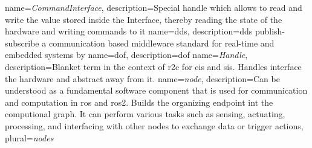 \hyphenation{
}

\newcommand{\mybibliographyfiles}{Bibliography/ipr_articles,Bibliography/kit_template_example_bibliography,Bibliography/masterthesis}


{
    name={\textit{CommandInterface}},
    description={Special \gls{handle} which allows to read and write the value stored inside the Interface, thereby reading the state of the hardware and writing commands to it}
}
{
    name={\gls{dds}},
    description={\acrlong{dds} publish-subscribe a communication based middleware standard for real-time and embedded systems by \cite{pardo-castellote_omg_2003, schlesselman_omg_2004, noauthor_data_nodate}}
}
{
    name={\gls{dof}},
    description={\acrlong{dof}}
}
{
    name={\textit{Handle}},
    description={Blanket term in the context of \gls{r2c} for \glspl{ci} and \glspl{si}. Handles interface the hardware and abstract away from it. }
}
{
    name={\textit{node}},
    description={Can be understood as a fundamental software component that is used for communication and computation in \gls{ros} and \gls{ros2}. Builds the organizing endpoint int the computional graph. It can perform various tasks such as sensing, actuating, processing, and interfacing with other nodes to exchange data or trigger actions},
    plural={\textit{nodes}}
}
